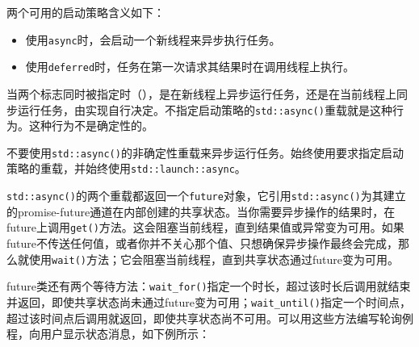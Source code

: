 
两个可用的启动策略含义如下：



\begin{itemize}
\item 使用\texttt{async}时，会启动一个新线程来异步执行任务。



\item 使用\texttt{deferred}时，任务在第一次请求其结果时在调用线程上执行。

\end{itemize}



当两个标志同时被指定时（），是在新线程上异步运行任务，还是在当前线程上同步运行任务，由实现自行决定。不指定启动策略的\texttt{std::\allowbreak{}async()}重载就是这种行为。这种行为不是确定性的。



\begin{myNote}[tip]
不要使用\texttt{std::\allowbreak{}async()}的非确定性重载来异步运行任务。始终使用要求指定启动策略的重载，并始终使用\texttt{std::\allowbreak{}launch::\allowbreak{}async}。
\end{myNote}



\texttt{std::\allowbreak{}async()}的两个重载都返回一个\texttt{future}对象，它引用\texttt{std::\allowbreak{}async()}为其建立的promise-future通道在内部创建的共享状态。当你需要异步操作的结果时，在future上调用\texttt{get()}方法。这会阻塞当前线程，直到结果值或异常变为可用。如果future不传送任何值，或者你并不关心那个值、只想确保异步操作最终会完成，那么就使用\texttt{wait()}方法；它会阻塞当前线程，直到共享状态通过future变为可用。



future类还有两个等待方法：\texttt{wait\_\allowbreak{}for()}指定一个时长，超过该时长后调用就结束并返回，即使共享状态尚未通过future变为可用；\texttt{wait\_\allowbreak{}until()}指定一个时间点，超过该时间点后调用就返回，即使共享状态尚不可用。可以用这些方法编写轮询例程，向用户显示状态消息，如下例所示：




